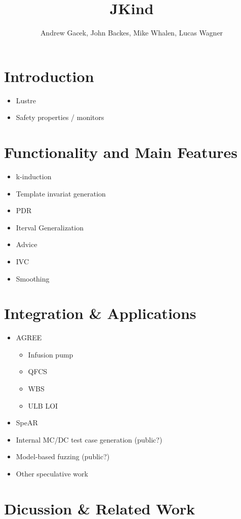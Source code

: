 \documentclass{article}
\title{JKind}
\author{Andrew Gacek, John Backes, Mike Whalen, Lucas Wagner}
\begin{document}
\maketitle

\section{Introduction}

\begin{itemize}
\item Lustre
\item Safety properties / monitors
\end{itemize}

\section{Functionality and Main Features}

\begin{itemize}
\item k-induction
\item Template invariat generation
\item PDR
\item Iterval Generalization
\item Advice
\item IVC
\item Smoothing
\end{itemize}

\section{Integration \& Applications}

\begin{itemize}
\item AGREE
  \begin{itemize}
  \item Infusion pump
  \item QFCS
  \item WBS
  \item ULB LOI
  \end{itemize}
\item SpeAR
\item Internal MC/DC test case generation (public?)
\item Model-based fuzzing (public?)
\item Other speculative work
\end{itemize}

\section{Dicussion \& Related Work}
\end{document}
